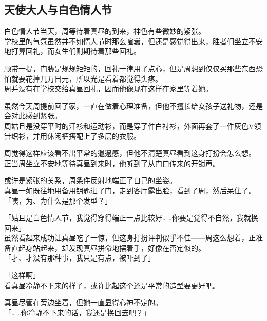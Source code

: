 \subsection{天使大人与白色情人节}

白色情人节当天，周等待着真昼的到来，神色有些微妙的紧张。\\

学校里的气氛虽然并不如情人节时那么喧嚣，但还是感觉得出来，胜者们坐立不安地打算回礼，而女生们则期待着那些回礼。

顺带一提，门胁是规规矩矩的，回礼一律用了点心，但是周想到仅仅买那些东西恐怕就要花掉几万日元，所以光是看着都觉得头疼。\\

周并没有在学校交给真昼回礼，因而他像现在这样在家里等着她。

虽然今天周提前回了家，一直在做着心理准备，但他不擅长给女孩子送礼物，还是会对此感到紧张。\\

周姑且是没穿平时的汗衫和运动衫，而是穿了件白衬衫，外面再套了一件灰色V领针织衫，并用休闲裤搭配上了多层的衣服。

周觉得这样应该看不出平常的邋遢感，但他不清楚真昼看到这身打扮会怎么想。\\

正当周坐立不安地等待真昼到来时，他听到了从门口传来的开锁声。

或许是紧张的关系，周条件反射地端正了自己的坐姿。\\

真昼一如既往地用备用钥匙进了门，走到客厅露出脸，看到了周，然后呆住了。\\

「咦，为、为什么是那个发型？」

「姑且是白色情人节，我觉得穿得端正一点比较好……你要是觉得不自然，我就换回来」\\

虽然看起来成功让真昼吃了一惊，但这身打扮评判似乎不佳——周这么想着，正准备直起身站起来，却发现真昼拼命地摆着手，好像在否定似的。\\

「才、才没有那种事，我只是有点，被吓到了」

「这样啊」\\

看真昼冷静不下来的样子，或许比起这个还是平常的造型要更好吧。

真昼尽管在旁边坐着，但她一直显得心神不定的。\\

「……你冷静不下来的话，我还是换回去吧？」

